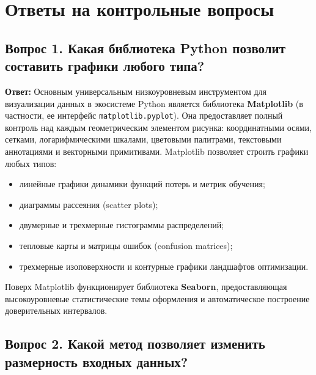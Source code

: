 \chapter{Ответы на контрольные вопросы}

\section*{Вопрос 1. Какая библиотека Python позволит составить графики любого типа?}

\textbf{Ответ:}
Основным универсальным низкоуровневым инструментом для визуализации данных в экосистеме Python является библиотека \textbf{Matplotlib} (в частности, ее интерфейс \texttt{matplotlib.pyplot}). Она предоставляет полный контроль над каждым геометрическим элементом рисунка: координатными осями, сетками, логарифмическими шкалами, цветовыми палитрами, текстовыми аннотациями и векторными примитивами. Matplotlib позволяет строить графики любых типов:
\begin{itemize}
    \item линейные графики динамики функций потерь и метрик обучения;
    \item диаграммы рассеяния (scatter plots);
    \item двумерные и трехмерные гистограммы распределений;
    \item тепловые карты и матрицы ошибок (confusion matrices);
    \item трехмерные изоповерхности и контурные графики ландшафтов оптимизации.
\end{itemize}
Поверх Matplotlib функционирует библиотека \textbf{Seaborn}, предоставляющая высокоуровневые статистические темы оформления и автоматическое построение доверительных интервалов.

\section*{Вопрос 2. Какой метод позволяет изменить размерность входных данных?}

